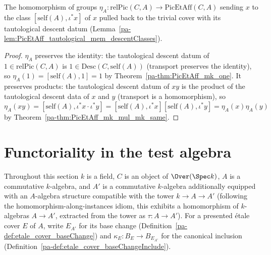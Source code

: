 \begin{definition}
  \label{pa-def:PicEtAff_unit}
  \leanok

  The homomorphism of groups \(\eta_A \colon \mathrm{relPic}(C,A) \to
  \mathrm{PicEtAff}(C,A)\) sending \(x\) to the class \([\mathrm{self}(A), \iota^{*}x]\) of \(x\)
  pulled back to the trivial cover with its tautological descent datum
  (Lemma~\ref{pa-lem:PicEtAff_tautological_mem_descentClasses}).
\end{definition}
\begin{proof}
  \leanok
  \(\eta_A\) preserves the identity: the tautological descent datum of \(1 \in
  \mathrm{relPic}(C,A)\) is \(1 \in \mathrm{Desc}(C,\mathrm{self}(A))\) (transport preserves
  the identity), so \(\eta_A(1) = [\mathrm{self}(A),1] = 1\) by
  Theorem~\ref{pa-thm:PicEtAff_mk_one}. It preserves products: the tautological descent datum of
  \(xy\) is the product of the tautological descent data of \(x\) and \(y\) (transport is a
  homomorphism), so \(\eta_A(xy) = [\mathrm{self}(A), \iota^{*}x \cdot \iota^{*}y] =
  [\mathrm{self}(A),\iota^{*}x][\mathrm{self}(A),\iota^{*}y] = \eta_A(x)\eta_A(y)\) by
  Theorem~\ref{pa-thm:PicEtAff_mk_mul_mk_same}.
\end{proof}

\section{Functoriality in the test algebra}

Throughout this section \(k\) is a field, \(C\) is an object of \(\Over(\Spec k)\), \(A\) is a
commutative \(k\)-algebra, and \(A'\) is a commutative \(k\)-algebra additionally equipped with
an \(A\)-algebra structure compatible with the tower \(k \to A \to A'\) (following the
homomorphism-along-instances idiom, this exhibits a homomorphism of \(k\)-algebras \(A \to
A'\), extracted from the tower as \(\tau \colon A \to A'\)). For a presented \'etale cover \(E\)
of \(A\), write \(E_{A'}\) for its base change (Definition~\ref{pa-def:etale_cover_baseChange}) and
\(\kappa_E \colon B_E \to B_{E_{A'}}\) for the canonical inclusion
(Definition~\ref{pa-def:etale_cover_baseChangeInclude}).

